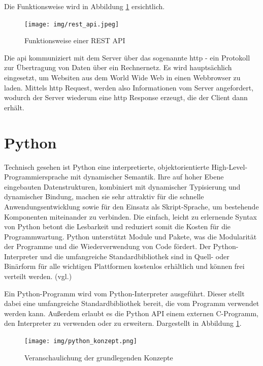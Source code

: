 \documentclass[oneside]{ausarbeitung}
\begin{document}
Die Funktionsweise wird in Abbildung \ref{fig:5} ersichtlich.

\begin{figure}[H]
  \centering
  \texttt{[image: img/rest\_api.jpeg]}
  \caption{Funktionsweise einer REST API\cite{rest_pic}}
  \label{fig:5}
\end{figure}

Die \ac{api} kommuniziert mit dem Server über das sogenannte
\ac{http} - ein Protokoll zur Übertragung von Daten über ein
Rechnernetz. Es wird hauptsächlich eingesetzt, um Websiten aus dem
World Wide Web in einen Webbrowser zu laden\cite{http_definition}.
Mittels \ac{http} Request, werden also Informationen vom Server
angefordert, wodurch der Server wiederum eine \ac{http} Response
erzeugt, die der Client dann erhält.

\section{Python}
\label{sec:python}

Technisch gesehen ist Python eine interpretierte, objektorientierte
High-Level-Programmiersprache mit dynamischer Semantik. Ihre auf hoher
Ebene eingebauten Datenstrukturen, kombiniert mit dynamischer
Typisierung und dynamischer Bindung, machen sie sehr attraktiv für
die schnelle Anwendungsentwicklung sowie für den Einsatz als
Skript-Sprache, um bestehende Komponenten miteinander zu verbinden.
Die einfach, leicht zu erlernende Syntax von Python betont die
Lesbarkeit und reduziert somit die Kosten für die Programmwartung.
Python unterstützt Module und Pakete, was die Modularität der
Programme und die Wiederverwendung von Code fördert. Der
Python-Interpreter und die umfangreiche Standardbibliothek sind in
Quell- oder Binärform für alle wichtigen Plattformen kostenlos
erhältlich und können frei verteilt werden. 
(vgl.\cite{python_definition})

Ein Python-Programm wird vom Python-Interpreter ausgeführt. Dieser
stellt dabei eine umfangreiche Standardbibliothek bereit, die vom
Programm verwendet werden kann. Außerdem erlaubt es die Python API
einem externen C-Programm, den Interpreter zu verwenden oder zu
erweitern. Dargestellt in Abbildung \ref{fig:5}.

\begin{figure}[H]
  \centering
  \texttt{[image: img/python\_konzept.png]}
  \caption{Veranschaulichung der grundlegenden Konzepte\cite{python_konzepte}}
  \label{fig:6}
\end{figure}
\end{document}
